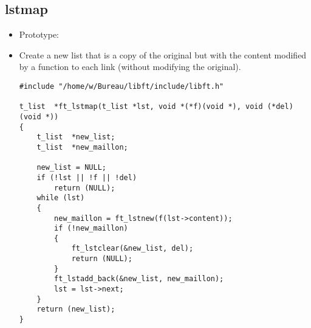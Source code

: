 \documentclass{article}
\begin{document}
		\subsection{lstmap}
			\begin{itemize}
				\item Prototype:
				\item Create a new list that is a copy of the original but with the content modified by a function to each link (without modifying the original).
				\begin{verbatim}
#include "/home/w/Bureau/libft/include/libft.h"

t_list	*ft_lstmap(t_list *lst, void *(*f)(void *), void (*del)(void *))
{
	t_list	*new_list;
	t_list	*new_maillon;

	new_list = NULL;
	if (!lst || !f || !del)
		return (NULL);
	while (lst)
	{
		new_maillon = ft_lstnew(f(lst->content));
		if (!new_maillon)
		{
			ft_lstclear(&new_list, del);
			return (NULL);
		}
		ft_lstadd_back(&new_list, new_maillon);
		lst = lst->next;
	}
	return (new_list);
}
				\end{verbatim}					
			\end{itemize}
		
		
			
		
			
	
\end{document}
